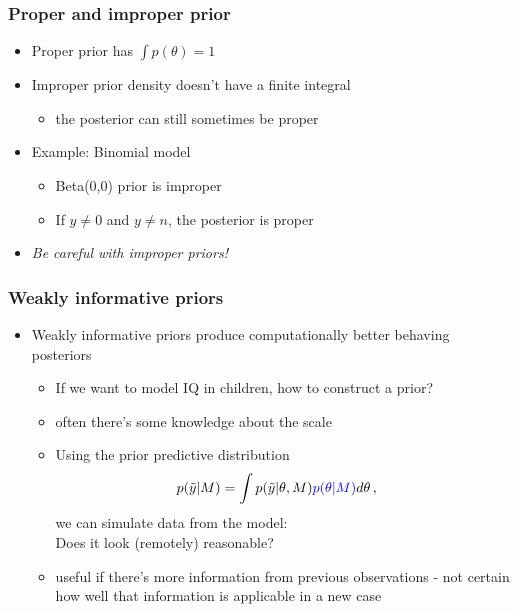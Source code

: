 \documentclass[10pt]{beamer}
\begin{document}
\begin{frame}
\frametitle{Proper and improper prior}

\begin{itemize}
  \item Proper prior has $\int p(\theta) = 1$
  \item Improper prior density doesn't have a finite integral
  \begin{itemize}
    \item the posterior can still sometimes be proper
  \end{itemize}
  \pause
  \item Example: Binomial model
  \begin{itemize}
    \item Beta(0,0) prior is improper
    \item If $y\neq 0$ and $y \neq n$, the posterior is proper
  \end{itemize}
  \item \emph{Be careful with improper priors!}
\end{itemize}

\end{frame}

\begin{frame}
\frametitle{Weakly informative priors}

  \begin{itemize}
  \item Weakly informative priors produce computationally better
    behaving posteriors
    \begin{itemize}
    \item If we want to model IQ in children, how to construct a prior? %
    \pause
    \item often there's some knowledge about the scale
    \item Using the {\color{blue} prior predictive} distribution
    \begin{align*}
      p(\tilde{y}|M) &= \int p(\tilde{y}|\theta,M){\color{blue}p(\theta|M)}d\theta\,,
    \end{align*}
    we can simulate data from the model: \\{\color{uured}Does it look (remotely) reasonable?}
    \item useful if there's more information from previous
      observations - not certain how well that information is
      applicable in a new case
    \end{itemize}
  \end{itemize}

\end{frame}
\end{document}
